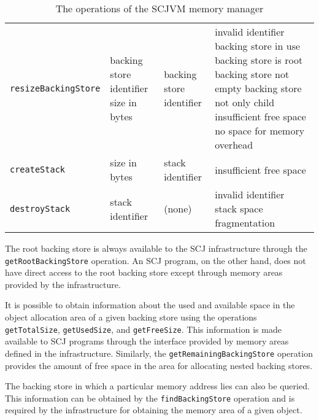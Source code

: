 \begin{table*}[ht]
\begin{tabular}{|l|p{3.1cm}|p{3.1cm}|p{3.9cm}|}
    \\\texttt{resizeBackingStore} &
    backing store identifier \newline
    size in bytes &
    backing store identifier &
    invalid identifier \newline
    backing store in use \newline
    backing store is root \newline
    backing store not empty \newline
    backing store not only child \newline
    insufficient free space \newline
    no space for memory overhead
    \\\texttt{createStack} &
    size in bytes &
    stack identifier &
    insufficient free space
    \\\texttt{destroyStack} &
    stack identifier &
    (none) &
    invalid identifier \newline
    stack space fragmentation
  \end{tabular}
  \caption{The operations of the SCJVM memory manager}
  \label{memory-manager-table}
\end{table*}

The root backing store is always available to the SCJ infrastructure
through the \texttt{get\-Root\-Backing\-Store} operation.
An SCJ program, on the other hand, does not have direct access to the
root backing store except through memory areas provided by the
infrastructure.

It is possible to obtain information about the used and available
space in the object allocation area of a given backing store using the
operations \texttt{get\-Total\-Size}, \texttt{get\-Used\-Size}, and
\texttt{get\-Free\-Size}.
This information is made available to SCJ programs through the
interface provided by memory areas defined in the infrastructure.
Similarly, the \texttt{getRemainingBackingStore} operation provides
the amount of free space in the area for allocating nested
backing stores.

The backing store in which a particular memory address lies can also
be queried.  
This information can be obtained by the \texttt{find\-Backing\-Store}
operation and is required by the infrastructure for obtaining the
memory area of a given object.

